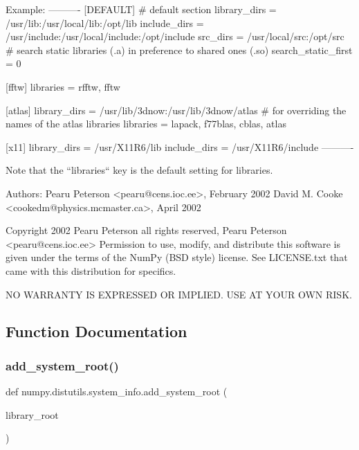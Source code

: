 \begin{DoxyVerb}
Example:
----------
[DEFAULT]
# default section
library_dirs = /usr/lib:/usr/local/lib:/opt/lib
include_dirs = /usr/include:/usr/local/include:/opt/include
src_dirs = /usr/local/src:/opt/src
# search static libraries (.a) in preference to shared ones (.so)
search_static_first = 0

[fftw]
libraries = rfftw, fftw

[atlas]
library_dirs = /usr/lib/3dnow:/usr/lib/3dnow/atlas
# for overriding the names of the atlas libraries
libraries = lapack, f77blas, cblas, atlas

[x11]
library_dirs = /usr/X11R6/lib
include_dirs = /usr/X11R6/include
----------

Note that the ``libraries`` key is the default setting for libraries.

Authors:
  Pearu Peterson <pearu@cens.ioc.ee>, February 2002
  David M. Cooke <cookedm@physics.mcmaster.ca>, April 2002

Copyright 2002 Pearu Peterson all rights reserved,
Pearu Peterson <pearu@cens.ioc.ee>
Permission to use, modify, and distribute this software is given under the
terms of the NumPy (BSD style) license.  See LICENSE.txt that came with
this distribution for specifics.

NO WARRANTY IS EXPRESSED OR IMPLIED.  USE AT YOUR OWN RISK.\end{DoxyVerb}
 

\subsection{Function Documentation}
\mbox{\label{namespacenumpy_1_1distutils_1_1system__info_a21bc27719b5a39735f6179e06aeaedf5}} 
\subsubsection{\texorpdfstring{add\+\_\+system\+\_\+root()}{add\_system\_root()}}
{\footnotesize\ttfamily def numpy.\+distutils.\+system\+\_\+info.\+add\+\_\+system\+\_\+root (\begin{DoxyParamCaption}\item[{}]{library\+\_\+root }\end{DoxyParamCaption})}

